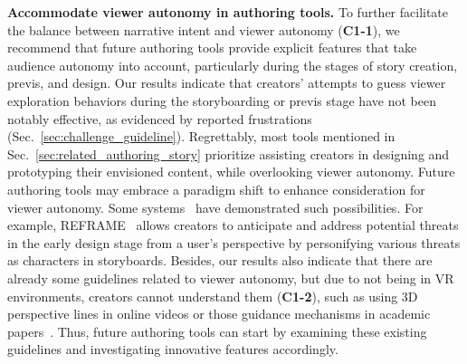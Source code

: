 \textbf{Accommodate viewer autonomy in authoring tools.}
To further facilitate the balance between narrative intent and viewer autonomy (\textbf{C1-1}), we recommend that future authoring tools provide explicit features that take audience autonomy into account, particularly during the stages of story creation, previs, and design.
Our results indicate that creators' attempts to guess viewer exploration behaviors during the storyboarding or previs stage have not been notably effective, as evidenced by reported frustrations (Sec.~\ref{sec:challenge_guideline}).
Regrettably, most tools mentioned in Sec.~\ref{sec:related_authoring_story} prioritize assisting creators in designing and prototyping their envisioned content, while overlooking viewer autonomy.
Future authoring tools may embrace a paradigm shift to enhance consideration for viewer autonomy.
Some systems~\cite{nebeling2020xrdirector, rajaram2023reframe} have demonstrated such possibilities.
For example, REFRAME~\cite{rajaram2023reframe} allows creators to anticipate and address potential threats in the early design stage from a user's perspective by personifying various threats as characters in storyboards.
Besides, our results also indicate that there are already some guidelines related to viewer autonomy, but due to not being in VR environments, creators cannot understand them (\textbf{C1-2}), such as using 3D perspective lines in online videos or those guidance mechanisms in academic papers~\cite{rothe2019guidance, schmitz2020directing}. Thus, future authoring tools can start by examining these existing guidelines and investigating innovative features accordingly. 

